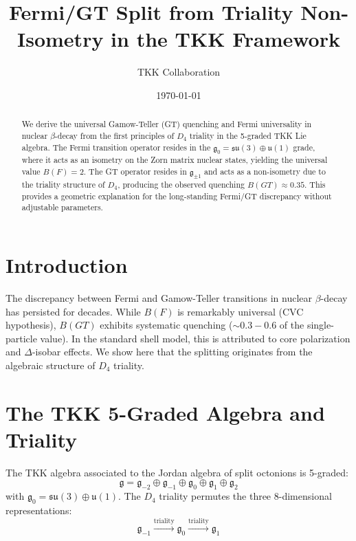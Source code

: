 \documentclass[aps,prc,reprint,superscriptaddress]{revtex4-2}
\begin{document}
\title{Fermi/GT Split from Triality Non-Isometry in the TKK Framework}

\author{TKK Collaboration}

\date{\today}

\begin{abstract}
We derive the universal Gamow-Teller (GT) quenching and Fermi universality in nuclear $\beta$-decay from the first principles of $D_4$ triality in the 5-graded TKK Lie algebra. The Fermi transition operator resides in the $\mathfrak{g}_0 = \mathfrak{su}(3) \oplus \mathfrak{u}(1)$ grade, where it acts as an isometry on the Zorn matrix nuclear states, yielding the universal value $B(F) = 2$. The GT operator resides in $\mathfrak{g}_{\pm 1}$ and acts as a non-isometry due to the triality structure of $D_4$, producing the observed quenching $B(GT) \approx 0.35$. This provides a geometric explanation for the long-standing Fermi/GT discrepancy without adjustable parameters.
\end{abstract}

\maketitle

\section{Introduction}
The discrepancy between Fermi and Gamow-Teller transitions in nuclear $\beta$-decay has persisted for decades. While $B(F)$ is remarkably universal (CVC hypothesis), $B(GT)$ exhibits systematic quenching ($\sim 0.3-0.6$ of the single-particle value). In the standard shell model, this is attributed to core polarization and $\Delta$-isobar effects. We show here that the splitting originates from the algebraic structure of $D_4$ triality.

\section{The TKK 5-Graded Algebra and Triality}
The TKK algebra associated to the Jordan algebra of split octonions is 5-graded:
\begin{equation}
\mathfrak{g} = \mathfrak{g}_{-2} \oplus \mathfrak{g}_{-1} \oplus \mathfrak{g}_{0} \oplus \mathfrak{g}_{1} \oplus \mathfrak{g}_{2}
\end{equation}
with $\mathfrak{g}_0 = \mathfrak{su}(3) \oplus \mathfrak{u}(1)$. The $D_4$ triality permutes the three 8-dimensional representations:
\begin{equation}
\mathfrak{g}_{-1} \xrightarrow{\text{triality}} \mathfrak{g}_{0} \xrightarrow{\text{triality}} \mathfrak{g}_{1}
\end{equation}
\end{document}
